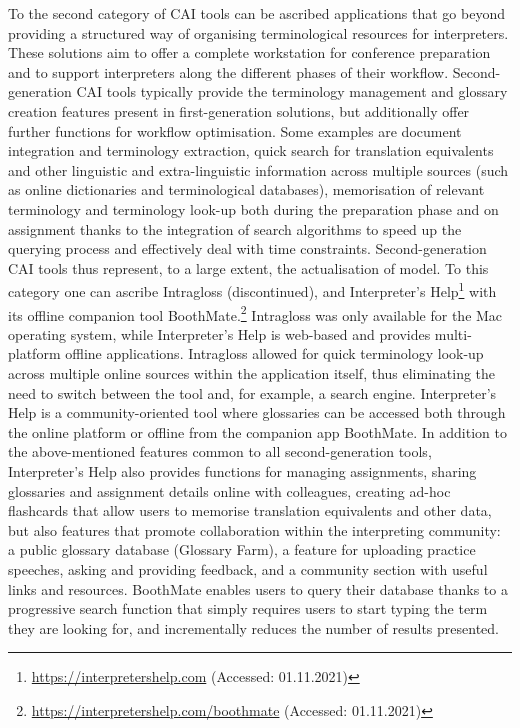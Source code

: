 To the second category of CAI tools can be ascribed applications that go beyond providing a structured way of organising terminological resources for interpreters. These solutions aim to offer a complete workstation for conference preparation and to support interpreters along the different phases of their workflow. Second-generation CAI tools typically provide the terminology management and glossary creation features present in first-generation solutions, but additionally offer further functions for workflow optimisation. Some examples are document integration and terminology extraction, quick search for translation equivalents and other linguistic and extra-linguistic information across multiple sources (such as online dictionaries and terminological databases), memorisation of relevant terminology and terminology look-up both during the preparation phase and on assignment thanks to the integration of search algorithms to speed up the querying process and effectively deal with time constraints. Second-generation CAI tools thus represent, to a large extent, the actualisation of  model. To this category one can ascribe Intragloss (discontinued), and Interpreter's Help\footnote{\url{https://interpretershelp.com} (Accessed: 01.11.2021)} with its offline companion tool BoothMate.\footnote{\url{https://interpretershelp.com/boothmate} (Accessed: 01.11.2021)} Intragloss was only available for the Mac operating system, while Interpreter's Help is web-based and provides multi-platform offline applications. Intragloss allowed for quick terminology look-up across multiple online sources within the application itself, thus eliminating the need to switch between the tool and, for example, a search engine. Interpreter's Help is a community-oriented tool where glossaries can be accessed both through the online platform or offline from the companion app BoothMate. In addition to the above-mentioned features common to all second-generation tools, Interpreter's Help also provides functions for managing assignments, sharing glossaries and assignment details online with colleagues, creating ad-hoc flashcards that allow users to memorise translation equivalents and other data, but also features that promote collaboration within the interpreting community: a public glossary database (Glossary Farm), a feature for uploading practice speeches, asking and providing feedback, and a community section with useful links and resources. BoothMate enables users to query their database thanks to a progressive search function that simply requires users to start typing the term they are looking for, and incrementally reduces the number of results presented.

